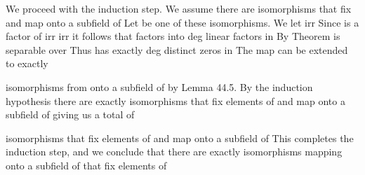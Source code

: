 \documentclass[11pt,oneside]{article}
\begin{document}
\begin{BookBody}

\begin{center}\begin{adjustbox}{max width=\linewidth}\end{adjustbox}\end{center}

We proceed with the induction step. We assume there are \BookInline{[E_{k}:F]} isomorphisms that fix  and map  onto a subfield of  Let \BookInline{\sigma } be one of these isomorphisms. We let  irr Since  is a factor of irr irr it follows that  factors into deg linear factors in  By Theorem  is separable over  Thus  has exactly deg distinct zeros in  The map \BookInline{\sigma } can be extended to exactly

\begin{center}\begin{adjustbox}{max width=\linewidth}\end{adjustbox}\end{center}

\noindent isomorphisms from  onto a subfield of  by Lemma 44.5. By the induction hypothesis there are exactly \BookInline{[E_{k}:F]} isomorphisms \BookInline{\sigma } that fix elements of  and map  onto a subfield of  giving us a total of

\begin{center}\begin{adjustbox}{max width=\linewidth}\BookInline{\displaystyle [E_{k+ 1}:E_{k}]\cdot [E_{k}:F]= [E_{k+ 1}:F]}\end{adjustbox}\end{center}

\noindent isomorphisms that fix elements of  and map  onto a subfield of  This completes the induction step, and we conclude that there are exactly \BookInline{[E_{n}:F]= [E:F]} isomorphisms mapping  onto a subfield of  that fix elements of \BookEnd{\blacklozenge}


\end{BookBody}
\end{document}
